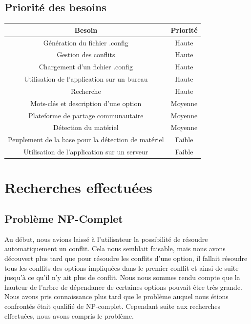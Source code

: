 ﻿\documentclass[17pts]{report}
\begin{document}
\subsection{Priorité des besoins}
\label{sub:Priorité des besoins}
\begin{tabular}{|c|c|}
    \hline
    Besoin & Priorité \\
    \hline
    \hline
    Génération du fichier .config & Haute \\
    \hline
    Gestion des conflits & Haute \\
    \hline
    Chargement d'un fichier .config & Haute \\
    \hline
    Utilisation de l'application sur un bureau & Haute \\
    \hline
    Recherche & Haute \\
    \hline
    Mots-clés et description d'une option & Moyenne \\
    \hline
    Plateforme de partage communautaire & Moyenne \\
    \hline
    Détection du matériel & Moyenne \\
    \hline
    Peuplement de la base pour la détection de matériel & Faible \\
    \hline
    Utilisation de l'application sur un serveur & Faible \\
    \hline
\end{tabular}

\section{Recherches effectuées}
\label{sec:Recherches effectuées}
\subsection{Problème NP-Complet}
\label{sub:Problème NP-Complet}
Au début, nous avions laissé à l'utilisateur la possibilité de résoudre
automatiquement un conflit. Cela nous semblait faisable, mais nous avons
découvert plus tard que pour résoudre les conflits d'une option, il fallait
résoudre tous les conflits des options impliquées dans le premier conflit et
ainsi de suite jusqu'à ce qu'il n'y ait plus de conflit. Nous nous sommes rendu
compte que la hauteur de l'arbre de dépendance de certaines options pouvait
être très grande. Nous avons pris connaissance plus tard que le problème auquel
nous étions confrontés était qualifié de NP-complet. Cependant suite aux
recherches effectuées, nous avons compris le problème.
\end{document}
